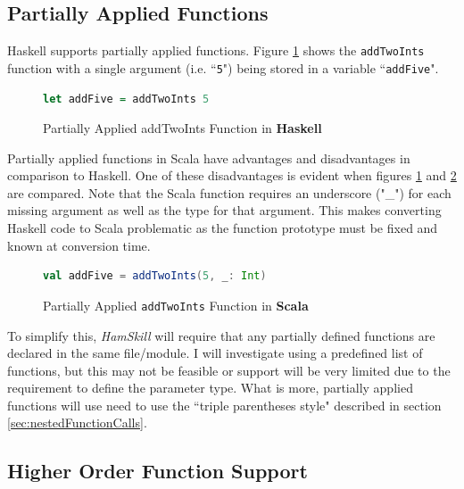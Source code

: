 \documentclass{report}
\begin{document}
\subsection{Partially Applied Functions}\label{sec:partiallyAppliedFunctions}

Haskell supports partially applied functions.  Figure \ref{fig:addFiveHaskell} shows the {\tt addTwoInts} function with a single argument (i.e. ``{\tt 5}") being stored in a variable ``{\tt addFive}".  

\begin{figure}[H]
\begin{mdframed}
\begin{lstlisting}[language=Haskell]
let addFive = addTwoInts 5
\end{lstlisting}
\end{mdframed}
\caption{Partially Applied addTwoInts Function in \textbf{Haskell}}\label{fig:addFiveHaskell}
\end{figure}

Partially applied functions in Scala have advantages and disadvantages in comparison to Haskell.  One of these disadvantages is evident when figures \ref{fig:addFiveHaskell} and \ref{fig:addFiveScala} are compared.  Note that the Scala function requires an underscore ("\_") for each missing argument as well as the type for that argument.  This makes converting Haskell code to Scala problematic as the function prototype must be fixed and known at conversion time.  

\begin{figure}[H]
\begin{mdframed}
\begin{lstlisting}[language=Scala]
val addFive = addTwoInts(5, _: Int)
\end{lstlisting}
\end{mdframed}
\caption{Partially Applied {\tt addTwoInts} Function in \textbf{Scala}}\label{fig:addFiveScala}
\end{figure}

To simplify this, \emph{HamSkill} will require that any partially defined functions are declared in the same file/module.  I will investigate using a predefined list of functions, but this may not be feasible or support will be very limited due to the requirement to define the parameter type.  What is more, partially applied functions will use need to use the ``triple parentheses style" described in section \ref{sec:nestedFunctionCalls}.

\subsection{Higher Order Function Support}\label{sec:higherOrderFunctions}
\end{document}
